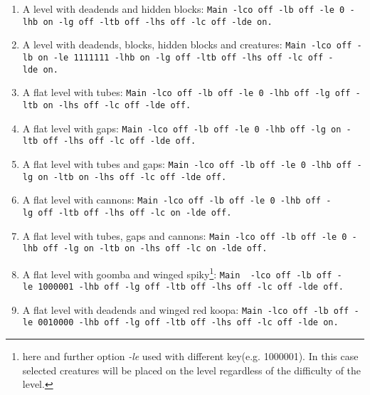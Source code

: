 \documentclass{report}
\begin{document}
\begin{enumerate}
\item A level with deadends and hidden blocks:\newline %
\texttt{Main~-lco~off~-lb~off~-le~0~-lhb~on~-lg~off~-ltb~off~-lhs~off~-lc~off~-lde~on.}
\item A level with deadends, blocks, hidden blocks and creatures:\newline %
\texttt{Main~-lco~off~-lb~on~-le~1111111~-lhb~on~-lg~off~-ltb~off~-lhs~off~-lc~off~-lde~on.}
\item A flat level with tubes: \newline %
\texttt{Main~-lco~off~-lb~off~-le~0~-lhb~off~-lg~off~-ltb~on~-lhs~off~-lc~off~-lde~off.}
\item A flat level with gaps: \newline %
\texttt{Main~-lco~off~-lb~off~-le~0~-lhb~off~-lg~on~-ltb~off~-lhs~off~-lc~off~-lde~off.}
\item A flat level with tubes and gaps: \newline %
\texttt{Main~-lco~off~-lb~off~-le~0~-lhb~off~-lg~on~-ltb~on~-lhs~off~-lc~off~-lde~off.}
\item A flat level with cannons: \newline %
\texttt{Main~-lco~off~-lb~off~-le~0~-lhb~off~-lg~off~-ltb~off~-lhs~off~-lc~on~-lde~off.}
\item A flat level with tubes, gaps and cannons: \newline %
\texttt{Main~-lco~off~-lb~off~-le~0~-lhb~off~-lg~on~-ltb~on~-lhs~off~-lc~on~-lde~off.}
\item A flat level with goomba and winged spiky\footnote{here and further option \emph{-le} used with different key(e.g. 1000001). In this case selected creatures will be placed on the level regardless of the difficulty of the level.}: \newline %
\texttt{Main ~-lco~off~-lb~off~-le~1000001~-lhb~off~-lg~off~-ltb~off~-lhs~off~-lc~off~-lde~off.}
\item A flat level with deadends and winged red koopa: \newline %
\texttt{Main~-lco~off~-lb~off~-le~0010000~-lhb~off~-lg~off~-ltb~off~-lhs~off~-lc~off~-lde~on.}


\end{enumerate}
\end{document}
